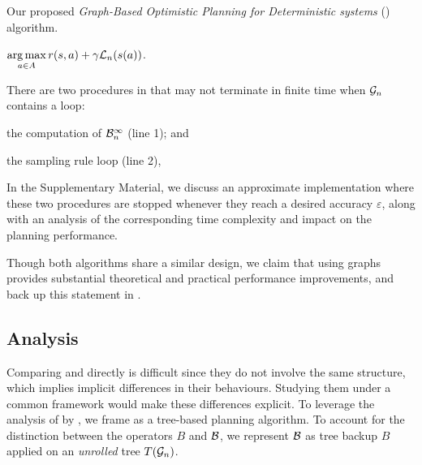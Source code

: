 \begin{algorithm}[th]
	\caption{Our proposed \emph{Graph-Based Optimistic Planning for Deterministic systems} (\GBOPD) algorithm.}
	\label{alg:gbop-d}
	\DontPrintSemicolon
	\Return $\displaystyle\operatorname*{arg\,max}_{a\in A} r(s,a) + \gamma \mathcal{L}_n(s(a))$. 
\end{algorithm}

\begin{remark}
	\begin{leftbar}[remarkbar]
	There are two procedures in \GBOPD that may not terminate in finite time when $\mathcal{G}_n$ contains a loop:
	\begin{enumerate*}[label=(\roman*)]
		\item the computation of $\mathcal{B}_n^\infty$ (line 1); and
		\item the sampling rule loop (line 2),
	\end{enumerate*}
	In the Supplementary Material, we discuss an approximate implementation where these two procedures are stopped whenever they reach a desired accuracy $\varepsilon$, along with an analysis of the corresponding time complexity and impact on the planning performance.
	\end{leftbar}
\end{remark}

Though both algorithms share a similar design, we claim that using graphs provides substantial theoretical and practical performance improvements, and back up this statement in .

\subsection{Analysis}
\label{sec:analysis}

Comparing \OPD and \GBOPD directly is difficult since they do not involve the same structure, which implies implicit differences in their behaviours. Studying them under a common framework would make these differences explicit. To leverage the analysis of \OPD by \citet{Hren2008optimistic}, we frame \GBOPD as a tree-based planning algorithm. To account for the distinction between the operators $B$ and $\mathcal{B}$, we represent $\mathcal{B}$ as tree backup $B$ applied on an \emph{unrolled} tree $T(\mathcal{G}_n)$.

